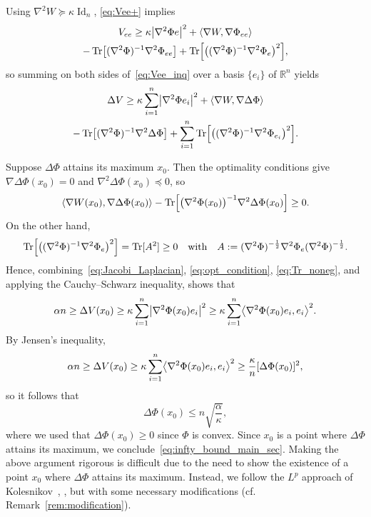 \documentclass[10pt]{amsart}
\theoremstyle{definition}\newtheorem{defi}[theo]{Definition}\newtheorem{rema}[theo]{Remark}\newtheorem{exam}[theo]{Example}\newtheorem{exem}[theo]{Example}\newtheorem{nota}[theo]{Notation}
\newcommand{\R}{\mathbb R}
\DeclareMathOperator{\Id}{Id}
\DeclareMathOperator{\Tr}{Tr}
\newcommand{\V}{V}
\newcommand{\W}{W}
\newcommand{\dd}{n}
\newcommand{\lsh}{\alpha}
\newcommand{\lc}{\kappa}
\newcommand{\OT}{\Phi}
\let\originalleft\left
\let\originalright\right
\renewcommand{\left}{\mathopen{}\mathclose\bgroup\originalleft}
\renewcommand{\right}{\aftergroup\egroup\originalright}
\begin{document}
Using $\nabla^2\W\succeq \lc \Id_{\dd}$, \eqref{eq:Vee+} implies
\begin{multline}\label{eq:Vee_inq}
\V_{ee}\ge \lc\left|\nabla^2\OT e\right|^2+\langle \nabla\W,\nabla\OT_{ee}\rangle\\
-\Tr\left[(\nabla^2\OT)^{-1}\nabla^2\OT_{ee}\right]
+\Tr\left[\left((\nabla^2\OT)^{-1}\nabla^2\OT_e\right)^2\right],
\end{multline}
so summing on both sides of~\eqref{eq:Vee_inq} over a basis $\{e_i\}$ of $\R^{\dd}$ yields
\begin{multline}\label{eq:Jacobi_Laplacian}
\Delta \V\ge\lc \sum_{i=1}^{\dd}\left|\nabla^2\OT e_i\right|^2+ \langle \nabla\W,\nabla\Delta\OT\rangle\\
-\Tr\left[(\nabla^2\OT)^{-1}\nabla^2\Delta\OT\right]+\sum_{i=1}^{\dd}\Tr\left[\left((\nabla^2\OT)^{-1}\nabla^2\OT_{e_i}\right)^2\right].
\end{multline}



Suppose $\Delta\OT$ attains its maximum $x_0$. Then the optimality conditions give $\nabla \Delta\OT(x_0)=0$ and $\nabla^2\Delta\OT(x_0) \preceq 0$, so
\begin{equation}\label{eq:opt_condition}
\langle \nabla\W(x_0),\nabla\Delta\OT(x_0)\rangle-\Tr\left[\left(\nabla^2\OT(x_0)\right)^{-1}\nabla^2\Delta\OT(x_0)\right]\ge 0.
\end{equation}
On the other hand,
\begin{equation}\label{eq:Tr_noneg}
\Tr\left[\left((\nabla^2\OT)^{-1}\nabla^2\OT_e\right)^2\right]=\Tr[A^2]\ge 0\quad\text{with}\quad A:=(\nabla^2\OT)^{-\frac{1}{2}}\nabla^2\OT_e(\nabla^2\OT)^{-\frac{1}{2}}.
\end{equation}
Hence, combining~\eqref{eq:Jacobi_Laplacian}, \eqref{eq:opt_condition}, \eqref{eq:Tr_noneg}, and applying the Cauchy--Schwarz inequality, shows that
\begin{equation}\label{eq:main_inq_proof_e}
\lsh\dd\ge\Delta \V(x_0)\ge \lc \sum_{i=1}^{\dd}\left|\nabla^2\OT(x_0) e_i\right|^2\ge \kappa\sum_{i=1}^{\dd}\left\langle \nabla^2\OT(x_0)e_i,e_i\right\rangle^2.
\end{equation}
By Jensen's inequality,
\begin{equation}\label{eq:main_inq_proof}
\lsh\dd\ge\Delta \V(x_0)\ge \lc\sum_{i=1}^{\dd}\left\langle \nabla^2\OT(x_0)e_i,e_i\right\rangle^2\ge \frac{\lc}{\dd}[\Delta\OT(x_0)]^2,
\end{equation}
so it follows that
\begin{equation}\label{eq:OT_subharmonic}
\Delta\OT(x_0)\le \dd\sqrt{\frac{\lsh}{\lc}},
\end{equation}
where we used that $\Delta\OT(x_0)\ge 0$ since $\OT$ is convex. Since $x_0$ is a point where $\Delta\OT$ attains its maximum, we conclude~\eqref{eq:infty_bound_main_sec}. Making the above argument rigorous is difficult due to the need to show the existence of a point $x_0$ where $\Delta\OT$ attains its maximum. Instead, we follow the $L^p$ approach of Kolesnikov~\cite{MR3201654}, \cite[\S~6]{kolesnikov2011mass}, but with some necessary modifications (cf. Remark~\ref{rem:modification}).
\end{document}
